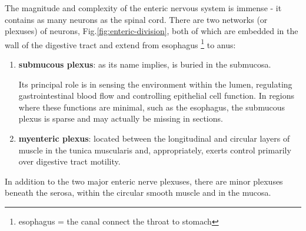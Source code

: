 The magnitude and complexity of the enteric nervous system is immense - it
contains as many neurons as the spinal cord. There are two networks (or
plexuses) of neurons, Fig.\ref{fig:enteric-division}, both of which are embedded
in the wall of the digestive tract and extend from esophagus \footnote{esophagus
= the canal connect the throat to stomach} to anus:
\begin{enumerate}
  
  \item  {\bf submucous plexus}:  as its name implies, is buried in the
  submucosa.
  
  Its principal role is in sensing the environment within the lumen, regulating
  gastrointestinal blood flow and controlling epithelial cell function. In
  regions where these functions are minimal, such as the esophagus, the
  submucous plexus is sparse and may actually be missing in sections.  
  
  \item {\bf myenteric plexus}: located between the longitudinal and circular
  layers of muscle in the tunica muscularis and, appropriately, exerts control
  primarily over digestive tract motility. 
  
\end{enumerate}
In addition to the two major enteric nerve plexuses, there are minor plexuses
beneath the serosa, within the circular smooth muscle and in the mucosa.

